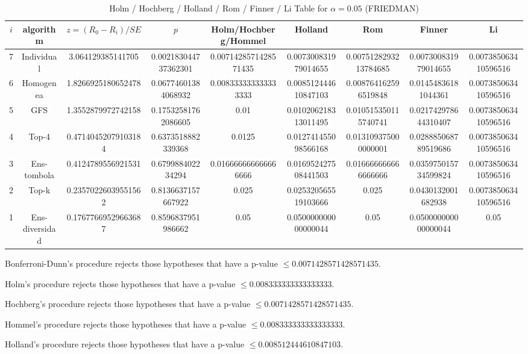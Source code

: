 \documentclass[a4paper,10pt]{article}
\begin{document}
\begin{landscape}
\begin{table}[!htp]
\begin{tabular}{
|r|r|r|r|r|r|r|r|r|}
\end{tabular}
\end{table}

\newpage

\begin{table}[!htp]
\centering\scriptsize
\caption{Holm / Hochberg / Holland / Rom / Finner / Li Table for $\alpha=0.05$ (FRIEDMAN)}
\begin{tabular}{ccccccccc}
$i$&algorithm&$z=(R_0 - R_i)/SE$&$p$&Holm/Hochberg/Hommel&Holland&Rom&Finner&Li\\
\hline
7&Individual&3.064129385141705&0.002183044737362301&0.0071428571428571435&0.007300831979014655&0.0075128293213784685&0.007300831979014655&0.007385063410596516\\
6&Homogenea&1.8266925180652478&0.06774601384068932&0.008333333333333333&0.008512444610847103&0.008764162596519848&0.01454836181044361&0.007385063410596516\\
5&GFS&1.3552879972742158&0.17532581762086605&0.01&0.010206218313011495&0.010515350115740741&0.021742978644310407&0.007385063410596516\\
4&Top-4&0.47140452079103184&0.6373518882339368&0.0125&0.012741455098566168&0.013109375000000001&0.028885068789519686&0.007385063410596516\\
3&Ens-tombola&0.4124789556921531&0.679988402234294&0.016666666666666666&0.016952427508441503&0.016666666666666666&0.035975015734599824&0.007385063410596516\\
2&Top-k&0.23570226039551562&0.8136637157667922&0.025&0.025320565519103666&0.025&0.0430132001682938&0.007385063410596516\\
1&Ens-diversidad&0.17677669529663687&0.8596837951986662&0.05&0.050000000000000044&0.05&0.050000000000000044&0.05\\
\hline
\end{tabular}
\end{table}
Bonferroni-Dunn's procedure rejects those hypotheses that have a p-value $\le0.0071428571428571435$.


Holm's procedure rejects those hypotheses that have a p-value $\le0.008333333333333333$.


Hochberg's procedure rejects those hypotheses that have a p-value $\le0.0071428571428571435$.


Hommel's procedure rejects those hypotheses that have a p-value $\le0.008333333333333333$.


Holland's procedure rejects those hypotheses that have a p-value $\le0.008512444610847103$.



\end{landscape}
\end{document}
